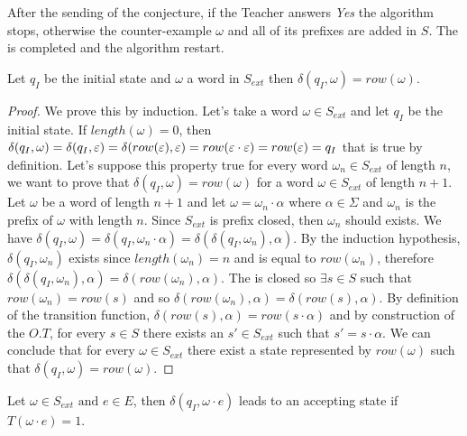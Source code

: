 After the sending of the conjecture, if the Teacher answers \textit{Yes} the algorithm stops, otherwise the counter-example $\omega$ and all of its prefixes are added in $S$. The \OT is completed and the algorithm restart.

\begin{lemma}
  \label{lemma:L_trans_from_QI}
  Let $q_I$ be the initial state and $\omega$ a word in $S_{ext}$ then $\delta(q_I, \omega) = row(\omega)$.
\end{lemma}

\begin{proof}
  We prove this by induction.
  Let's take a word $\omega \in S_{ext}$ and let $q_I$ be the initial state.
  If $length(\omega) = 0$, then $\delta(q_I, \omega) = \delta(q_I, \varepsilon) = \delta(row(\varepsilon), \varepsilon) =  row(\varepsilon \cdot \varepsilon) = row(\varepsilon) = q_I$ that is true by definition.
  Let's suppose this property true for every word $\omega_n \in S_{ext}$ of length $n$, we want to prove that $\delta(q_I, \omega) = row(\omega)$ for a word $\omega \in S_{ext}$ of length $n+1$.
  Let $\omega$ be a word of length $n+1$ and let $\omega = \omega_n \cdot \alpha$ where $\alpha \in \Sigma$ and $\omega_n$ is the prefix of $\omega$ with length $n$. Since $S_{ext}$ is prefix closed, then $\omega_n$ should exists.
  We have $\delta(q_I, \omega) = \delta(q_I, \omega_n \cdot \alpha) = \delta(\delta(q_I, \omega_n), \alpha)$. By the induction hypothesis, $\delta(q_I, \omega_n)$ exists since $length(\omega_n) = n$ and is equal to $row(\omega_n)$, therefore $\delta(\delta(q_I, \omega_n), \alpha) = \delta(row(\omega_n), \alpha)$.
  The \OT is closed so $\exists s \in S$ such that $row(\omega_n) = row(s)$ and so $\delta(row(\omega_n), \alpha) = \delta(row(s), \alpha)$.
  By definition of the transition function, $\delta(row(s), \alpha) = row(s \cdot \alpha)$ and by construction of the $O.T$, for every $s \in S$ there exists an $s' \in S_{ext}$ such that $s' = s \cdot \alpha$.
  We can conclude that for every $\omega \in S_{ext}$ there exist a state represented by $row(\omega)$ such that $\delta(q_I, \omega) = row(\omega)$.
\end{proof}

\begin{lemma}
  \label{lemma:L_acceptance}
  Let $\omega \in S_{ext} \text{ and } e \in E$, then $\delta(q_I, \omega \cdot e)$ leads to an accepting state if $T(\omega \cdot e) = 1$.
\end{lemma}

